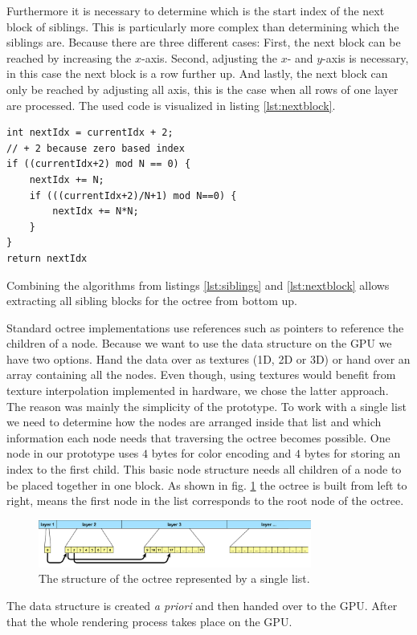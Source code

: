 \documentclass[12pt,conference]{IEEEtran}
\begin{document}
Furthermore it is necessary to determine which is the start index of the next block of siblings. This is particularly more complex than determining which the siblings are. Because there are three different cases: First, the next block can be reached by increasing the $x$-axis. Second, adjusting the $x$- and $y$-axis is necessary, in this case the next block is a row further up. And lastly, the next block can only be reached by adjusting all axis, this is the case when all rows of one layer are processed. The used code is visualized in listing \ref{lst:nextblock}.
\begin{lstlisting}[label=lst:nextblock, caption={Finding the next block start index needs to cover three cases.}]
int nextIdx = currentIdx + 2;
// + 2 because zero based index
if ((currentIdx+2) mod N == 0) {
	nextIdx += N;
	if (((currentIdx+2)/N+1) mod N==0) {
		nextIdx += N*N;
	}
}
return nextIdx
\end{lstlisting}

Combining the algorithms from listings \ref{lst:siblings} and \ref{lst:nextblock} allows extracting all sibling blocks for the octree from bottom up.

\par

Standard octree implementations use references such as pointers to reference the children of a node. Because we want to use the data structure on the GPU we have two options. Hand the data over as textures (1D, 2D or 3D) or hand over an array containing all the nodes. Even though, using textures would benefit from texture interpolation implemented in hardware, we chose the latter approach. The reason was mainly the simplicity of the prototype. To work with a single list we need to determine how the nodes are arranged inside that list and which information each node needs that traversing the octree becomes possible. One node in our prototype uses $4$ bytes for color encoding and $4$ bytes for storing an index to the first child. This basic node structure needs all children of a node to be placed together in one block. As shown in fig. \ref{fig:datastructure} the octree is built from left to right, means the first node in the list corresponds to the root node of the octree. 
\begin{figure}[htp]
	\centering
	\includegraphics[width=0.8\textwidth]{images/datastructure.png}
	\caption{The structure of the octree represented by a single list.}
	\label{fig:datastructure}
\end{figure}
The data structure is created \textit{a priori} and then handed over to the GPU. After that the whole rendering process takes place on the GPU.
\end{document}
